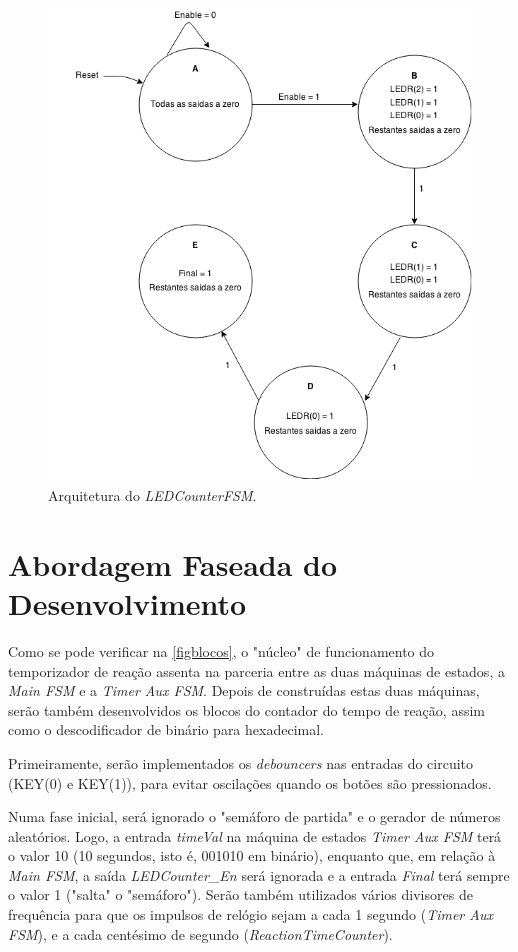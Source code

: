 \documentclass[a4paper,11pt,onecolumn]{report}
\begin{document}
\begin{figure}[h]
\centerline{\includegraphics[scale=0.30]{Images/CounterLEDFSMDiagram}}
\caption{Arquitetura do \textit{LEDCounterFSM}.}
\label{figledcounterfsm}
\end{figure}

\pagebreak

\section{Abordagem Faseada do Desenvolvimento}
Como se pode verificar na \autoref{figblocos}, o "núcleo" de funcionamento do temporizador de reação assenta na parceria entre as duas máquinas de estados, a \textit{Main FSM} e a \textit{Timer Aux FSM}. Depois de construídas estas duas máquinas, serão também desenvolvidos os blocos do contador do tempo de reação, assim como o descodificador de binário para hexadecimal.

Primeiramente, serão implementados os \textit{debouncers} nas entradas do circuito (KEY(0) e KEY(1)), para evitar oscilações quando os botões são pressionados.

Numa fase inicial, será ignorado o "semáforo de partida" e o gerador de números aleatórios. Logo, a entrada \textit{timeVal} na máquina de estados \textit{Timer Aux FSM} terá o valor 10 (10 segundos, isto é, 001010 em binário), enquanto que, em relação à \textit{Main FSM}, a saída \textit{LEDCounter\_En} será ignorada e a entrada \textit{Final} terá sempre o valor 1 ("salta" o "semáforo"). Serão também utilizados vários divisores de frequência para que os impulsos de relógio sejam a cada 1 segundo (\textit{Timer Aux FSM}), e a cada centésimo de segundo (\textit{ReactionTimeCounter}).
\end{document}
